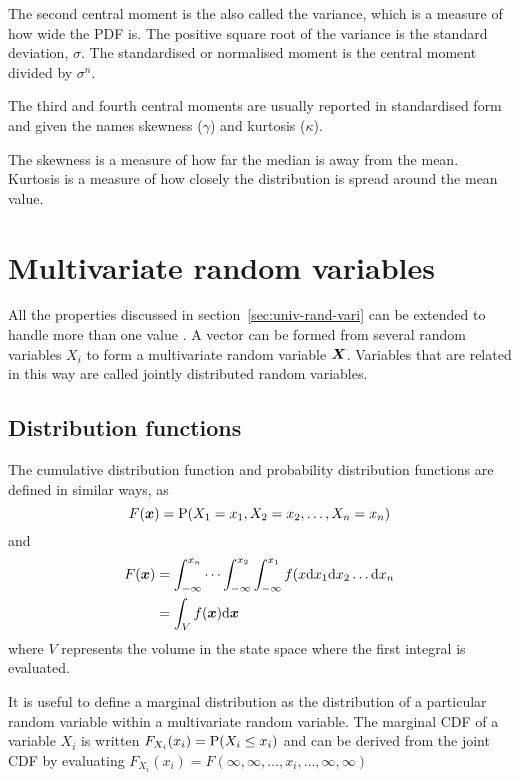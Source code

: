 The second central moment is the also called the variance, which is a measure of how wide the PDF is.
The positive square root of the variance is the standard deviation, $\sigma$.
The standardised or normalised moment is the central moment divided by $\sigma^n$.

The third and fourth central moments are usually reported in standardised form and given the names skewness ($\gamma$) and kurtosis ($\kappa$).

The skewness is a measure of how far the median is away from the mean.
Kurtosis is a measure of how closely the distribution is spread around the mean value.

\section{Multivariate random variables}
All the properties discussed in section~\ref{sec:univ-rand-vari} can be extended to handle more than one value \cite[65]{kulkarni1999modeling}.
A vector can be formed from several random variables $X_i$ to form a multivariate random variable $\boldsymbol{X}$.
Variables that are related in this way are called jointly distributed random variables.

\subsection{Distribution functions}
The cumulative distribution function and probability distribution functions are defined in similar ways, as 
\begin{equation}
  \label{eq:mvcdf}
  F(\boldsymbol{x}) = \mathrm{P}(X_1=x_1, X_2=x_2,\dots, X_n = x_n)
\end{equation}
and
\begin{align}
  \label{eq:mvpdf}
  F(\boldsymbol{x}) &= \int_{-\infty}^{x_n}\cdots\int_{-\infty}^{x_2}\int_{-\infty}^{x_1} f(x \mathrm{d} x_1 \mathrm{d} x_2 \dots \mathrm{d} x_n \\
              &= \int_V f(\boldsymbol{x}) \mathrm{d} \boldsymbol{x}
\end{align}
where $V$ represents the volume in the state space where the first integral is evaluated.

It is useful to define a marginal distribution as the distribution of a particular random variable within a multivariate random variable.  
The marginal CDF of a variable $X_i$ is written $F_{X_i}(x_i) = \mathrm{P}(X_i \leq x_i)$ and can be derived from the joint CDF by evaluating $F_{X_i}(x_i) = F(\infty,\infty,\dots,x_i,\dots,\infty,\infty)$

